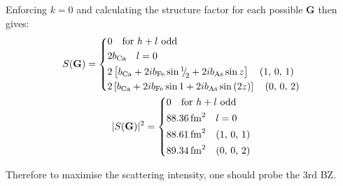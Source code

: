 \begin{parts}
\begin{subparts}
		Enforcing $k=0$ and calculating the structure factor for each possible $\mathbf{G}$ then gives:
		\begin{gather*}
			S(\mathbf{G}) =
			\begin{cases*}
				0 \textnormal{\hspace{1em}for $h+l$ odd} \\
				2 b_\textnormal{Ca} \textnormal{\hspace{1em}}l=0 \\
				2 \sbracket{ b_\textnormal{Ca} + 2ib_\textnormal{Fe} \sin\diagfrac{1}{2} + 2ib_\textnormal{As} \sin z } \textnormal{\hspace{1em}(1, 0, 1)} \\
				2 \sbracket{ b_\textnormal{Ca} + 2ib_\textnormal{Fe} \sin 1 + 2ib_\textnormal{As} \sin\rbracket{2z} } \textnormal{\hspace{1em}(0, 0, 2)}
			\end{cases*} \\
			|S(\mathbf{G})|^2 =
			\begin{cases*}
				0 \textnormal{\hspace{1em}for $h+l$ odd} \\
				\SI{88.36}{\femto\metre\squared} \textnormal{\hspace{1em}}l=0 \\
				\SI{88.61}{\femto\metre\squared} \textnormal{\hspace{1em}(1, 0, 1)} \\
				\SI{89.34}{\femto\metre\squared} \textnormal{\hspace{1em}(0, 0, 2)}
			\end{cases*}
		\end{gather*}
		
		Therefore to maximise the scattering intensity, one should probe the 3rd BZ.
	\end{subparts}
\end{parts}